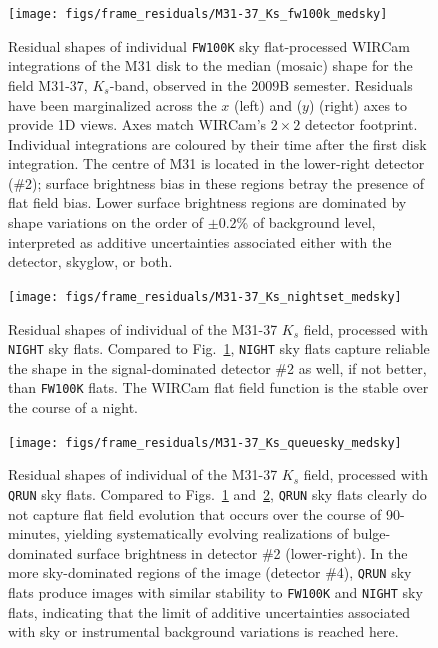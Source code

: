 \documentclass[iop]{emulateapj}
\newcommand{\Fig}[1]{Fig.~\ref{fig:#1}}  %
\begin{document}
\begin{figure}[p]
\centering
\texttt{[image: figs/frame\_residuals/M31-37\_Ks\_fw100k\_medsky]}
\caption{Residual shapes of individual \texttt{FW100K} sky flat-processed WIRCam integrations of the M31 disk to the median (mosaic) shape for the field M31-37, $K_s$-band, observed in the 2009B semester.
Residuals have been marginalized across the $x$ (left) and ($y$) (right) axes to provide 1D views.
Axes match WIRCam's $2\times2$ detector footprint.
Individual integrations are coloured by their time after the first disk integration.
The centre of M31 is located in the lower-right detector (\#2); surface brightness bias in these regions betray the presence of flat field bias. Lower surface brightness regions are dominated by shape variations on the order of $\pm 0.2\%$ of background level, interpreted as additive uncertainties associated either with the detector, skyglow, or both.}
\label{fig:frame_residuals_M31-37_Ks_fw100k_medsky}
\end{figure}

\begin{figure}[p]
\centering
\texttt{[image: figs/frame\_residuals/M31-37\_Ks\_nightset\_medsky]}
\caption{Residual shapes of individual of the M31-37 $K_s$ field, processed with \texttt{NIGHT} sky flats.
Compared to \Fig{frame_residuals_M31-37_Ks_fw100k_medsky}, \texttt{NIGHT} sky flats capture reliable the shape in the signal-dominated detector \#2 as well, if not better, than \texttt{FW100K} flats.
The WIRCam flat field function is the stable over the course of a night.
}
\label{fig:frame_residuals_M31-37_Ks_nightset}
\end{figure}

\begin{figure}[p]
\centering
\texttt{[image: figs/frame\_residuals/M31-37\_Ks\_queuesky\_medsky]}
\caption{Residual shapes of individual of the M31-37 $K_s$ field, processed with \texttt{QRUN} sky flats.
Compared to Figs.~\ref{fig:frame_residuals_M31-37_Ks_fw100k_medsky} and~\ref{fig:frame_residuals_M31-37_Ks_nightset}, \texttt{QRUN} sky flats clearly do not capture flat field evolution that occurs over the course of 90-minutes, yielding systematically evolving realizations of bulge-dominated surface brightness in detector \#2 (lower-right). In the more sky-dominated regions of the image (detector \#4), \texttt{QRUN} sky flats produce images with similar stability to \texttt{FW100K} and \texttt{NIGHT} sky flats, indicating that the limit of additive uncertainties associated with sky or instrumental background variations is reached here.}
\label{fig:frame_residuals_M31-37_Ks_QRUN}
\end{figure}
\end{document}
